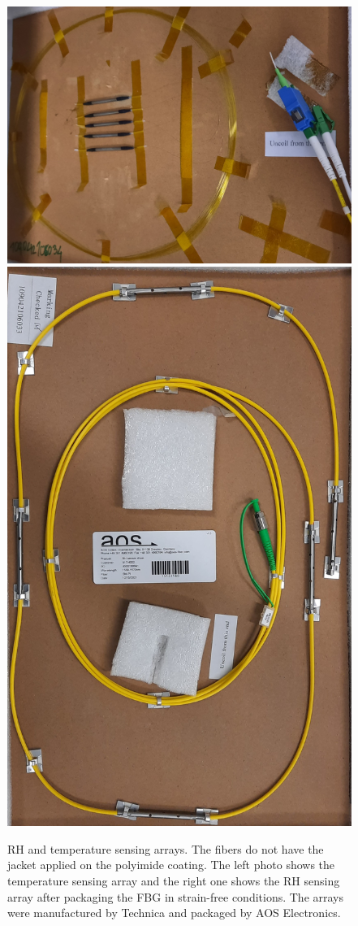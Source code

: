 \begin{figure}[!h]
\centering
\includegraphics[angle=90,width=0.43\columnwidth]{Chapter5/images/t_array1.jpg}
\includegraphics[angle=90,width=0.52\columnwidth]{Chapter5/images/rh_array1.jpg}
\caption{\gls{RH} and temperature sensing arrays. The fibers do not have the jacket applied on the polyimide coating. The left photo shows the temperature sensing array and the right one shows the \gls{RH} sensing array after packaging the FBG in strain-free conditions. The arrays were manufactured by Technica and packaged by AOS Electronics.}
\label{fig_single_photo}
\end{figure}

